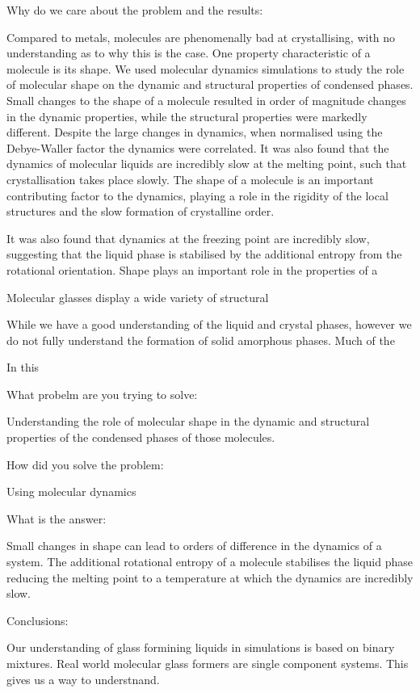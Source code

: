 
\beforepreface


Why do we care about the problem and the results:


Compared to metals, molecules are phenomenally bad at crystallising, with no understanding as to why this is the case. One property characteristic of a molecule is its shape. We used molecular dynamics simulations to study the role of molecular shape on the dynamic and structural properties of condensed phases. Small changes to the shape of a molecule resulted in order of magnitude changes in the dynamic properties, while the structural properties were markedly different. Despite the large changes in dynamics, when normalised using the Debye-Waller factor the dynamics were correlated. It was also found that the dynamics of molecular liquids are incredibly slow at the melting point, such that crystallisation takes place slowly. The shape of a molecule is an important contributing factor to the dynamics, playing a role in the rigidity of the local structures and the slow formation of crystalline order.


It was also found that dynamics at the freezing point are incredibly slow, suggesting that the liquid phase is stabilised by the additional entropy from the rotational orientation. Shape plays an important role in the properties of a 


Molecular glasses display a wide variety of structural


While we have a good understanding of the liquid and crystal phases, however we do not fully understand the formation of solid amorphous phases. Much of the 

In this 


What probelm are you trying to solve:

Understanding the role of molecular shape in the dynamic and structural properties of the condensed phases of those molecules.

How did you solve the problem:

Using molecular dynamics

What is the answer:

Small changes in shape can lead to orders of difference in the dynamics of a system.
The additional rotational entropy of a molecule stabilises the liquid phase reducing the melting point to a temperature at which the dynamics are incredibly slow.

Conclusions:

Our understanding of glass formining liquids in simulations is based on binary mixtures. Real world molecular glass formers are single component systems. This gives us a way to understnand.



